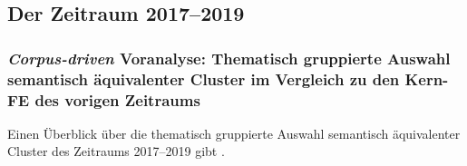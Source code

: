 \subsection{Der Zeitraum 2017--2019}\label{der-zeitraum-2017-2019}

\subsubsection{\texorpdfstring{\emph{Corpus-driven} Voranalyse: Thematisch gruppierte Auswahl semantisch äquivalenter Cluster im Vergleich zu den Kern-FE des vorigen Zeitraums}{Corpus-driven Voranalyse: Thematisch gruppierte Auswahl semantisch äquivalenter Cluster im Vergleich zu den Kern-FE des vorigen Zeitraums}}\label{corpus-driven-voranalyse-thematisch-gruppierte-auswahl-semantisch-aequivalenter-cluster-im-vergleich-zu-den-kern-fe-des-vorigen-zeitraums-5}

Einen Überblick über die thematisch gruppierte Auswahl semantisch äquivalenter Cluster des Zeitraums 2017--2019 gibt .

